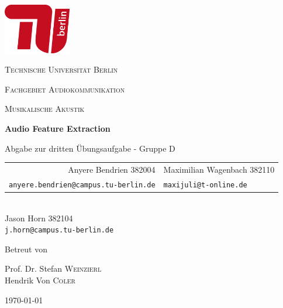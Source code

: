 \begin{titlepage}
    \centering
    \includegraphics[height=62pt]{tu_red.png}\par
    {\scshape\huge Technische Universität Berlin \par}
    {\scshape\Large Fachgebiet Audiokommunikation\par}
    \vspace{1.5cm}
    {\scshape\LARGE Musikalische Akustik\par}
    \vspace{1.5cm}

    {\Huge\bfseries {Audio Feature Extraction}\par}
    \vspace{0.1cm}
    {\large Abgabe zur dritten Übungsaufgabe - Gruppe D \par}
    \vspace{1cm}

    {\itshape
        \begin{tabular}{rl}
          Anyere Bendrien 382004 &
          Maximilian Wagenbach 382110 \\
          \vspace{0.2cm}
          \small \texttt{anyere.bendrien@campus.tu-berlin.de} &
          \small \texttt{maxijuli@t-online.de}
        \end{tabular}\\
        Jason Horn 382104 \\
        \small \texttt{j.horn@campus.tu-berlin.de} 
    }
    \vfill
    
    Betreut von\par
    Prof. Dr. Stefan \textsc{Weinzierl} \\
    Hendrik Von \textsc{Coler}
    \vspace{1cm}
    
    {\large \today\par}
\end{titlepage}